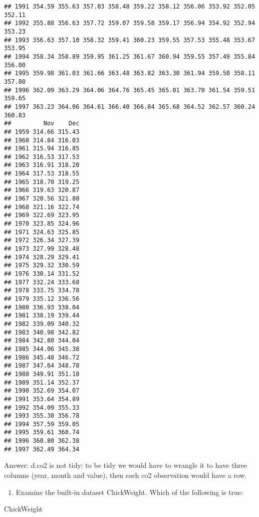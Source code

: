 \documentclass[
]{article}
\newenvironment{Shaded}{\begin{snugshade}}{\end{snugshade}}
\newcommand{\NormalTok}[1]{#1}
\providecommand{\tightlist}{%
  \setlength{\itemsep}{0pt}\setlength{\parskip}{0pt}}
\begin{document}
\begin{verbatim}
## 1991 354.59 355.63 357.03 358.48 359.22 358.12 356.06 353.92 352.05 352.11
## 1992 355.88 356.63 357.72 359.07 359.58 359.17 356.94 354.92 352.94 353.23
## 1993 356.63 357.10 358.32 359.41 360.23 359.55 357.53 355.48 353.67 353.95
## 1994 358.34 358.89 359.95 361.25 361.67 360.94 359.55 357.49 355.84 356.00
## 1995 359.98 361.03 361.66 363.48 363.82 363.30 361.94 359.50 358.11 357.80
## 1996 362.09 363.29 364.06 364.76 365.45 365.01 363.70 361.54 359.51 359.65
## 1997 363.23 364.06 364.61 366.40 366.84 365.68 364.52 362.57 360.24 360.83
##         Nov    Dec
## 1959 314.66 315.43
## 1960 314.84 316.03
## 1961 315.94 316.85
## 1962 316.53 317.53
## 1963 316.91 318.20
## 1964 317.53 318.55
## 1965 318.70 319.25
## 1966 319.63 320.87
## 1967 320.56 321.80
## 1968 321.16 322.74
## 1969 322.69 323.95
## 1970 323.85 324.96
## 1971 324.63 325.85
## 1972 326.34 327.39
## 1973 327.99 328.48
## 1974 328.29 329.41
## 1975 329.32 330.59
## 1976 330.14 331.52
## 1977 332.24 333.68
## 1978 333.75 334.78
## 1979 335.12 336.56
## 1980 336.93 338.04
## 1981 338.19 339.44
## 1982 339.09 340.32
## 1983 340.98 342.82
## 1984 342.80 344.04
## 1985 344.06 345.38
## 1986 345.48 346.72
## 1987 347.64 348.78
## 1988 349.91 351.18
## 1989 351.14 352.37
## 1990 352.69 354.07
## 1991 353.64 354.89
## 1992 354.09 355.33
## 1993 355.30 356.78
## 1994 357.59 359.05
## 1995 359.61 360.74
## 1996 360.80 362.38
## 1997 362.49 364.34
\end{verbatim}

Answer: d.co2 is not tidy: to be tidy we would have to wrangle it to
have three columns (year, month and value), then each co2 observation
would have a row.

\begin{enumerate}
\def\labelenumi{\arabic{enumi}.}
\setcounter{enumi}{1}
\tightlist
\item
  Examine the built-in dataset ChickWeight. Which of the following is
  true:
\end{enumerate}

\begin{Shaded}
\begin{Highlighting}[]
\NormalTok{ChickWeight}
\end{Highlighting}
\end{Shaded}
\end{document}
